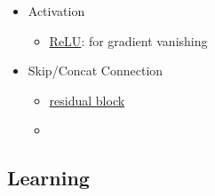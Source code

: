 \begin{itemize}
\begin{itemize}
\begin{itemize}
		\end{itemize}
	\item Activation 
		\begin{itemize}
		\item \hyperref[DL_Act_ReLU]{ReLU}: for gradient vanishing
		\end{itemize}
	\item Skip/Concat Connection
		\begin{itemize}
		\item \hyperref[DL_Block_Res]{residual block}
		\item 
		\end{itemize}
	\end{itemize}	
\end{itemize}

\subsection{Learning}

